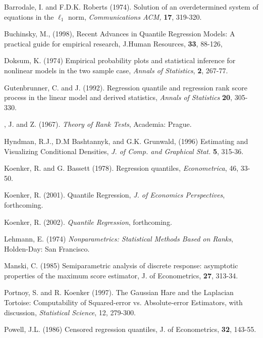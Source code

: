 
{\sc Barrodale, I.  and F.D.K. Roberts} (1974).
Solution of an overdetermined system of
equations in the $\ell_1$ norm, {\it Communications ACM,} {\bf 17}, 319-320.

{\sc Buchinsky, M.}, (1998),
Recent Advances in Quantile Regression Models:
A practical guide for empirical research,
J.Human Resources, {\bf 33}, {88-126},



{\sc Doksum, K.} (1974)  Empirical probability plots and statistical
inference for nonlinear models in the two sample case,
{\it Annals of Statistics}, {\bf 2}, 267-77.
 
{\sc Gutenbrunner, C. and J. \Jureckova} (1992).
Regression quantile and regression rank score process in the linear model and
derived statistics,  {\it Annals of Statistics} {\bf 20}, 305-330.
 
{\sc \Hajek, J. and Z. \Sidak}  (1967).
{\it Theory of Rank Tests},
Academia: Prague.
 
{\sc Hyndman, R.J., D.M Bashtannyk, and G.K. Grunwald}, (1996)
Estimating and Visualizing Conditional Densities, {\it J. of Comp.
and Graphical Stat.} {\bf 5}, 315-36.

{\sc Koenker, R. and G. Bassett} (1978).  Regression quantiles,
{\it Econometrica}, 46, 33-50.

{\sc Koenker, R.} (2001).  Quantile Regression,
{\it J. of Economics Perspectives}, forthcoming.

{\sc Koenker, R.} (2002).  {\it Quantile Regression}, forthcoming.



{\sc Lehmann, E.} (1974)  {\it Nonparametrics:  Statistical Methods Based on
Ranks}, Holden-Day: San Francisco.

{\sc Manski, C.} (1985) Semiparametric analysis of discrete response:
asymptotic properties of the maximum score estimator, {J. of Econometrics},
{\bf 27}, 313-34.

{\sc Portnoy, S. and R. Koenker } (1997).
The Gaussian Hare and the Laplacian Tortoise:
Computability of Squared-error vs. Absolute-error Estimators, with discussion,
{\it Statistical Science}, 12, 279-300.

{\sc Powell, J.L.} (1986) Censored regression quantiles,
{J. of Econometrics}, {\bf 32}, 143-55.




